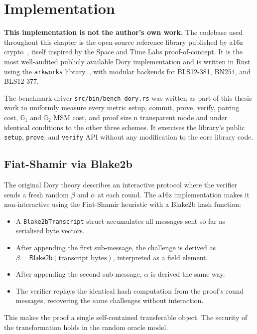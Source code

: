\section{Implementation}

\textbf{This implementation is not the author's own work.} The codebase used
throughout this chapter is the open-source reference library published by
a16z crypto~\cite{a16z_dory}, itself inspired by the Space and Time Labs
proof-of-concept. It is the most well-audited publicly available Dory
implementation and is written in Rust using the \texttt{arkworks}
library~\cite{arkworks}, with modular backends for BLS12-381, BN254, and
BLS12-377.

The benchmark driver \texttt{src/bin/bench\_dory.rs} was written as part of
this thesis work to uniformly measure every metric setup, commit, prove,
verify, pairing cost, $\mathbb{G}_1$ and $\mathbb{G}_2$ MSM cost, and proof
size n transparent mode and under identical conditions to the other three
schemes. It exercises the library's public \texttt{setup}, \texttt{prove},
and \texttt{verify} API without any modification to the core library code.

\subsection{Fiat-Shamir via Blake2b}

The original Dory theory describes an interactive protocol where the verifier
sends a fresh random $\beta$ and $\alpha$ at each round. The a16z
implementation makes it non-interactive using the Fiat-Shamir heuristic with
a Blake2b hash function:

\begin{itemize}
    \item A \texttt{Blake2bTranscript} struct accumulates all messages sent
          so far as serialised byte vectors.
    \item After appending the first sub-message, the challenge is derived as
          $\beta = \mathsf{Blake2b}(\text{transcript bytes})$, interpreted as
          a field element.
    \item After appending the second sub-message, $\alpha$ is derived the same
          way.
    \item The verifier replays the identical hash computation from the proof's
          round messages, recovering the same challenges without interaction.
\end{itemize}

This makes the proof a single self-contained transferable object. The
security of the transformation holds in the random oracle model.

